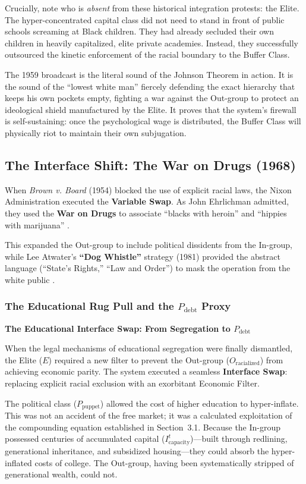 \documentclass[12pt]{article}
\begin{document}
Crucially, note who is \textit{absent} from these historical integration protests: the Elite. The hyper-concentrated capital class did not need to stand in front of public schools screaming at Black children. They had already secluded their own children in heavily capitalized, elite private academies. Instead, they successfully outsourced the kinetic enforcement of the racial boundary to the Buffer Class.

The 1959 broadcast is the literal sound of the Johnson Theorem in action. It is the sound of the ``lowest white man'' fiercely defending the exact hierarchy that keeps his own pockets empty, fighting a war against the Out-group to protect an ideological shield manufactured by the Elite. It proves that the system's firewall is self-sustaining: once the psychological wage is distributed, the Buffer Class will physically riot to maintain their own subjugation.

\subsection{The Interface Shift: The War on Drugs (1968)}
When \textit{Brown v. Board} (1954) blocked the use of explicit racial laws, the Nixon Administration executed the \textbf{Variable Swap}. As John Ehrlichman admitted, they used the \textbf{War on Drugs} to associate ``blacks with heroin'' and ``hippies with marijuana'' \cite{baum, vera, alexander}.

This expanded the Out-group to include political dissidents from the In-group, while Lee Atwater's \textbf{``Dog Whistle''} strategy (1981) provided the abstract language (``State's Rights,'' ``Law and Order'') to mask the operation from the white public \cite{lopez, phillips}.

\subsubsection*{The Educational Rug Pull and the $P_{\text{debt}}$ Proxy}

\textbf{The Educational Interface Swap: From Segregation to $P_{\text{debt}}$}

When the legal mechanisms of educational segregation were finally dismantled, the Elite ($E$) required a new filter to prevent the Out-group ($O_{\text{racialized}}$) from achieving economic parity. The system executed a seamless \textbf{Interface Swap}: replacing explicit racial exclusion with an exorbitant Economic Filter.

The political class ($P_{\text{puppet}}$) allowed the cost of higher education to hyper-inflate. This was not an accident of the free market; it was a calculated exploitation of the compounding equation established in Section~3.1. Because the In-group possessed centuries of accumulated capital ($I^{t}_{\text{capacity}}$)---built through redlining, generational inheritance, and subsidized housing---they could absorb the hyper-inflated costs of college. The Out-group, having been systematically stripped of generational wealth, could not.
\end{document}
